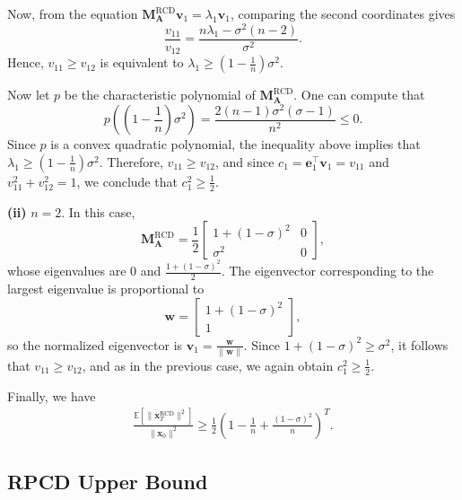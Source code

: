 \documentclass{article}
\theoremstyle{plain}
\theoremstyle{definition}
\theoremstyle{remark}
\def\bigopen#1{\left(#1\right)}
\newcommand{\RCD}{\text{RCD}} %
\def\ve{{\bm{e}}}
\def\vv{{\bm{v}}}
\def\vw{{\bm{w}}}
\def\vx{{\bm{x}}}
\def\mA{{\bm{A}}}
\def\mM{{\bm{M}}}
\newcommand{\E}{\mathbb{E}}
\begin{document}
Now, from the equation $\mM_{\mA}^{\RCD} \vv_1 = \lambda_1 \vv_1$, comparing the second coordinates gives
\[
\frac{v_{11}}{v_{12}} = \frac{n\lambda_1 - \sigma^2(n-2)}{\sigma^2}.
\]
Hence, $v_{11} \ge v_{12}$ is equivalent to $\lambda_1 \ge \left(1 - \frac{1}{n}\right)\sigma^2$.

Now let $p$ be the characteristic polynomial of $\mM_{\mA}^{\RCD}$. One can compute that
\[
p\left(\left(1 - \frac{1}{n}\right)\sigma^2\right) = \frac{2(n-1)\sigma^2(\sigma - 1)}{n^2} \le 0.
\]
Since $p$ is a convex quadratic polynomial, the inequality above implies that $\lambda_1 \ge \left(1 - \frac{1}{n}\right)\sigma^2$. Therefore, $v_{11} \ge v_{12}$, and since $c_1 = \ve_1^\top \vv_1 = v_{11}$ and $v_{11}^2 + v_{12}^2 = 1$, we conclude that $c_1^2 \ge \frac{1}{2}$.

\textbf{(ii)} $n = 2$. In this case,
\[
\mM_{\mA}^{\RCD} = \frac{1}{2} \begin{bmatrix}
1 + (1 - \sigma)^2 & 0 \\
\sigma^2 & 0
\end{bmatrix},
\]
whose eigenvalues are $0$ and $\frac{1 + (1 - \sigma)^2}{2}$. The eigenvector corresponding to the largest eigenvalue is proportional to
\[
\vw = \begin{bmatrix}
1 + (1 - \sigma)^2 \\
1
\end{bmatrix},
\]
so the normalized eigenvector is $\vv_1 = \frac{\vw}{\|\vw\|}$. Since $1 + (1 - \sigma)^2 \ge \sigma^2$, it follows that $v_{11} \ge v_{12}$, and as in the previous case, we again obtain $c_1^2 \ge \frac{1}{2}$.

Finally, we have
\begin{align*}
    \frac{\E [\|\vx_T^{\RCD}\|^2]}{\|\vx_0\|^2} \ge \frac{1}{2} \bigopen{1 - \frac{1}{n} + \frac{(1 - \sigma)^2}{n}}^T.
\end{align*}


\subsection{RPCD Upper Bound}
\end{document}

